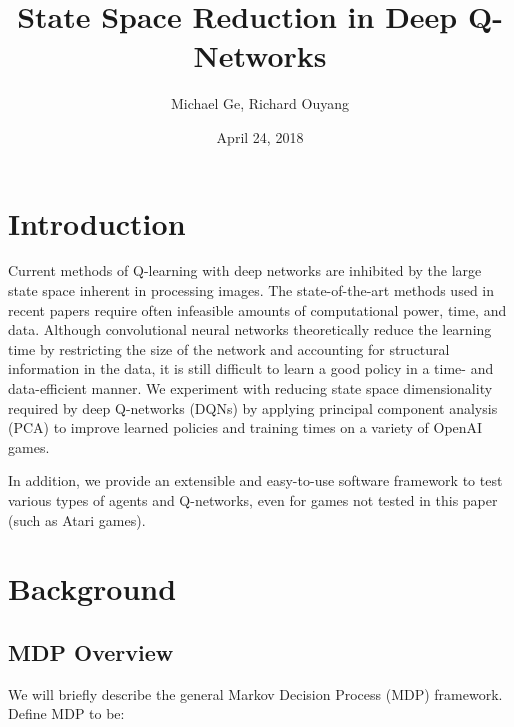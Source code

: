 \documentclass[11pt]{article}
\title{State Space Reduction in Deep Q-Networks}
\author{Michael Ge, Richard Ouyang}
\date{April 24, 2018}
\begin{document}
\maketitle

\section{Introduction}

Current methods of Q-learning with deep networks are inhibited by the
large state space inherent in processing images. The state-of-the-art
methods used in recent papers \cite{mnih2013playing, mnih2015human, van2016deep} require often infeasible
amounts of computational power, time, and data. Although convolutional
neural networks theoretically reduce the learning time by restricting
the size of the network and accounting for structural information in
the data, it is still difficult to learn a good policy in a time- and
data-efficient manner. We experiment with reducing state space
dimensionality required by deep Q-networks (DQNs) by applying
principal component analysis (PCA) to improve learned policies and
training times on a variety of OpenAI games.

In addition, we provide an extensible and easy-to-use software
framework to test various types of agents and Q-networks, even for
games not tested in this paper (such as Atari games).

\section{Background}

\subsection{MDP Overview}

We will briefly describe the general Markov Decision Process (MDP)
framework. Define MDP to be:
\end{document}
